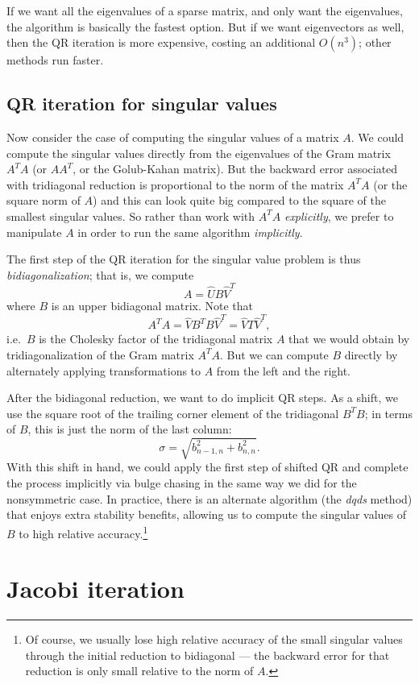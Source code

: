 \documentclass[12pt, leqno]{article} %
\begin{document}
If we want all the eigenvalues of a sparse matrix, and only want the
eigenvalues, the algorithm is basically the fastest option. But if we
want eigenvectors as well, then the QR iteration is more expensive,
costing an additional $O(n^3)$; other methods run faster.

\subsection{QR iteration for singular values}

Now consider the case of computing the singular values of a matrix $A$.
We could compute the singular values directly from the eigenvalues of
the Gram matrix $A^T A$ (or $AA^T$, or the Golub-Kahan matrix).  But
the backward error associated with tridiagonal reduction is proportional
to the norm of the matrix $A^T A$ (or the square norm of $A$) and this
can look quite big compared to the square of the smallest singular values.
So rather than work with $A^T A$ {\em explicitly}, we prefer to manipulate
$A$ in order to run the same algorithm {\em implicitly}.

The first step of the QR iteration for the singular value problem is
thus {\em bidiagonalization}; that is, we compute
\[
  A = \hat{U} B \hat{V}^T
\]
where $B$ is an upper bidiagonal matrix.  Note that
\[
  A^T A = \hat{V} B^T B \hat{V}^T = \hat{V} T \hat{V}^T,
\]
i.e.~$B$ is the Cholesky factor of the tridiagonal matrix $A$ that
we would obtain by tridiagonalization of the Gram matrix $A^T A$.
But we can compute $B$ directly by alternately applying
transformations to $A$ from the left and the right.

After the bidiagonal reduction, we want to do implicit QR steps.
As a shift, we use the square root of the trailing
corner element of the tridiagonal $B^T B$; in terms of $B$, this is
just the norm of the last column:
\[
  \sigma = \sqrt{b_{n-1,n}^2 + b_{n,n}^2}.
\]
With this shift in hand, we could apply the first step of shifted
QR and complete the process implicitly via bulge chasing in the same
way we did for the nonsymmetric case.  In practice, there is an alternate
algorithm (the {\em dqds} method) that enjoys extra stability benefits,
allowing us to compute the singular values of $B$ to high relative
accuracy.\footnote{%
Of course, we usually lose high relative accuracy of the small singular
values through the initial reduction to
bidiagonal --- the backward error for that reduction is only small
relative to the norm of $A$.}

\section{Jacobi iteration}
\end{document}
